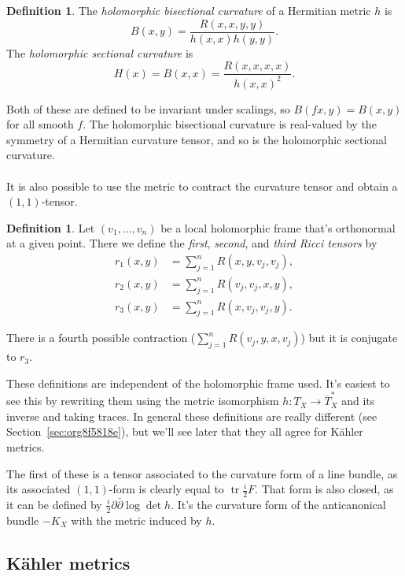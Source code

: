 \documentclass[11pt]{article}
\theoremstyle{definition}
\newtheorem{defi}[theo]{Definition}
\DeclareMathOperator{\tr}{tr}
\begin{document}
\begin{defi}
  The \emph{holomorphic bisectional curvature} of a Hermitian metric $h$ is
$$
B(x,y) = \frac{R(x,x,y,y)}{h(x,x)h(y,y)}.
$$
The \emph{holomorphic sectional curvature} is
$$
H(x) = B(x,x) = \frac{R(x,x,x,x)}{h(x,x)^2}.
$$
\end{defi}

Both of these are defined to be invariant under scalings, so $B(fx,y) = B(x,y)$ for all smooth $f$. The holomorphic bisectional curvature is real-valued by the symmetry of a Hermitian curvature tensor, and so is the holomorphic sectional curvature.


\paragraph{}
It is also possible to use the metric to contract the curvature tensor and obtain a $(1,1)$-tensor.

\begin{defi}
  Let $(v_1, \ldots, v_n)$ be a local holomorphic frame that's orthonormal at a given point. There we define the \emph{first}, \emph{second}, and \emph{third Ricci tensors} by
\begin{align*}
r_1(x,y) &= \sum_{j=1}^n R(x,y,v_j,v_j),
\\
r_2(x,y) &= \sum_{j=1}^n R(v_j, v_j, x,y),
\\
r_3(x,y) &= \sum_{j=1}^n R(x,v_j,v_j,y).
\end{align*}
\end{defi}

There is a fourth possible contraction ($\sum_{j=1}^n R(v_j,y,x,v_j)$) but it is conjugate to $r_3$.

These definitions are independent of the holomorphic frame used. It's easiest to see this by rewriting them using the metric isomorphism $h : T_X \to \overline T_X^*$ and its inverse and taking traces. In general these definitions are really different (see Section~\ref{sec:org8f5818e}), but we'll see later that they all agree for K\"ahler metrics.

The first of these is a tensor associated to the curvature form of a line bundle, as its associated $(1,1)$-form is clearly equal to $\tr \frac i2 F$. That form is also closed, as it can be defined by $\frac i2 \partial\bar\partial \log \det h$. It's the curvature form of the anticanonical bundle $-K_X$ with the metric induced by $h$.




\subsection{K\"ahler metrics}
\end{document}
